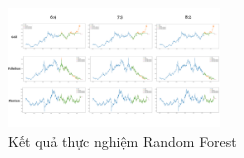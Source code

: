 \begin{figure}[htbp]
\centerline{\includegraphics[width=0.5\textwidth]{img/RF_result.png}}
\caption{Kết quả thực nghiệm Random Forest}
\label{fig}
\end{figure}